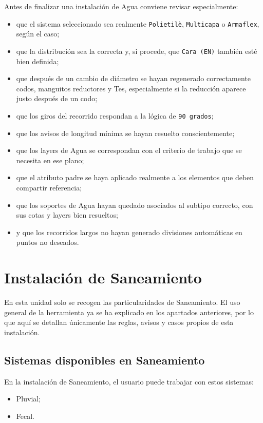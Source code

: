 \documentclass[12pt,a4paper]{article}
\begin{document}
Antes de finalizar una instalación de Agua conviene revisar especialmente:

\begin{itemize}
\item que el sistema seleccionado sea realmente \texttt{Polietilè}, \texttt{Multicapa} o \texttt{Armaflex}, según el caso;
\item que la distribución sea la correcta y, si procede, que \texttt{Cara (EN)} también esté bien definida;
\item que después de un cambio de diámetro se hayan regenerado correctamente codos, manguitos reductores y Tes, especialmente si la reducción aparece justo después de un codo;
\item que los giros del recorrido respondan a la lógica de \texttt{90 grados};
\item que los avisos de longitud mínima se hayan resuelto conscientemente;
\item que los layers de Agua se correspondan con el criterio de trabajo que se necesita en ese plano;
\item que el atributo padre se haya aplicado realmente a los elementos que deben compartir referencia;
\item que los soportes de Agua hayan quedado asociados al subtipo correcto, con sus cotas y layers bien resueltos;
\item y que los recorridos largos no hayan generado divisiones automáticas en puntos no deseados.
\end{itemize}

\section{Instalación de Saneamiento}

En esta unidad solo se recogen las particularidades de Saneamiento. El uso general de la herramienta ya se ha explicado en los apartados anteriores, por lo que aquí se detallan únicamente las reglas, avisos y casos propios de esta instalación.

\subsection{Sistemas disponibles en Saneamiento}

En la instalación de Saneamiento, el usuario puede trabajar con estos sistemas:

\begin{itemize}
\item Pluvial;
\item Fecal.
\end{itemize}
\end{document}

